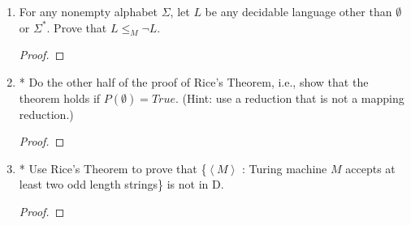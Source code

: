 \documentclass[10pt]{article}
\newcommand{\brackets}[1]{\left< #1 \right>}
\begin{document}
\begin{enumerate}[1)]
\begin{proof}[Proof]
If $\brackets{M, w} \in \lnot$ H: $L(M_\#) = \emptyset$ which is regular. Oracle accepts.\\
If $\brackets{M, w} \not \in \lnot$ H: $L(M_\#) = a^nb^n$ which is regular. Oracle rejects.\\

So $C$ decides $\lnot$ H.  Therefore $Oracle$ does not exist.
\end{proof}


\item
For any nonempty alphabet $\Sigma$, let $L$ be any decidable language other than $\emptyset$ or $\Sigma ^*$. Prove that $L \leq _M \lnot L$.
\begin{proof}[Proof]
\end{proof}



\item
* Do the other half of the proof of Rice's Theorem, i.e., show that the theorem holds if $P(\emptyset) = True$. (Hint: use a reduction that is not a mapping reduction.)
\begin{proof}[Proof]
\end{proof}


\item
* Use Rice's Theorem to prove that \{$\brackets{M}$ : Turing machine $M$ accepts at least two odd length strings\} is not in D.
\begin{proof}[Proof]
\end{proof}
\end{enumerate}
\end{document}
